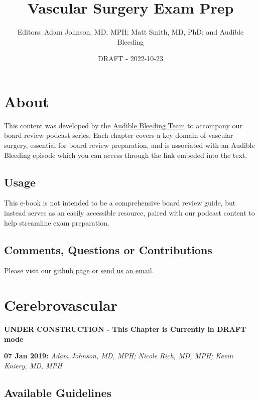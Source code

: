 \documentclass[
]{book}
\title{Vascular Surgery Exam Prep}
\author{Editors: Adam Johnson, MD, MPH; Matt Smith, MD, PhD; and Audible Bleeding}
\date{DRAFT - 2022-10-23}
\begin{document}
\maketitle

{
\setcounter{tocdepth}{1}
\tableofcontents
}
\hypertarget{about}{%
\chapter{About}\label{about}}

This content was developed by the \href{https://www.audiblebleeding.com/about-1/}{Audible Bleeding Team} to accompany our board review podcast series.
Each chapter covers a key domain of vascular surgery, essential for board review preparation, and is associated with an Audible Bleeding episode which you can access through the link embeded into the text.

\hypertarget{usage}{%
\section{Usage}\label{usage}}

This e-book is not intended to be a comprehensive board review guide, but instead serves as an easily accessible resource, paired with our podcast content to help streamline exam preparation.

\hypertarget{comments-questions-or-contributions}{%
\section{Comments, Questions or Contributions}\label{comments-questions-or-contributions}}

Please visit our \href{https://github.com/adam-mdmph/VS-Exam-Prep}{github page} or \href{mailto:audiblebleeding@vascularsociety.org}{send us an email}.

\hypertarget{cerebrovascular}{%
\chapter{Cerebrovascular}\label{cerebrovascular}}

\textbf{UNDER CONSTRUCTION - This Chapter is Currently in DRAFT mode}

\textbf{07 Jan 2019:} \emph{Adam Johnson, MD, MPH; Nicole Rich, MD, MPH; Kevin
Kniery, MD, MPH}

\hypertarget{available-guidelines}{%
\section{Available Guidelines}\label{available-guidelines}}
\end{document}

